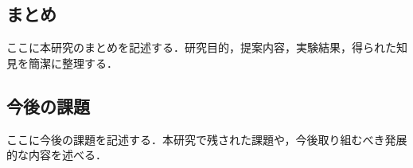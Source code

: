 \subsection{まとめ}
ここに本研究のまとめを記述する．研究目的，提案内容，実験結果，得られた知見を簡潔に整理する．

\subsection{今後の課題}
ここに今後の課題を記述する．本研究で残された課題や，今後取り組むべき発展的な内容を述べる．
